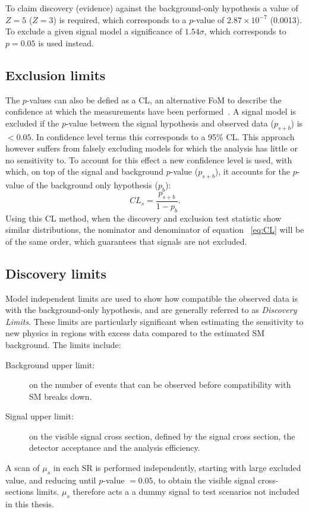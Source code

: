 	 To claim discovery (evidence) against the background-only hypothesis a value of $Z=5$ ($Z=3$) is required, which corresponds to a $p$-value of $2.87\times10^{-7}$ (0.0013). 
	To exclude a given signal model a significance of $1.54\sigma$, which corresponds to $p=0.05$ is used instead. 
	
	\subsection{Exclusion limits}
	The $p$-values can also be defied as a \ac{CL}, an alternative \ac{FoM} to describe the confidence at which the measurements have been performed~\cite{Read:2002hq}.
	A signal model is excluded if the $p$-value between the signal hypothesis and observed data ($p_{s+b}$) is $<0.05$. In confidence level terms this corresponds to a 95\% \ac{CL}. 
	This approach however suffers from falsely excluding models for which the analysis has little or no sensitivity to. 
	To account for this effect a new confidence level is used, with which, on top of the signal and background $p$-value ($p_{s+b}$), it accounts for the $p$-value of the background only hypothesis ($p_b$):
	\begin{equation}
	CL_s=\frac{p_{s+b}}{1-p_b}.
	\label{eq:CL}
	\end{equation}
	Using this \ac{CL} method, when the discovery and exclusion test statistic show similar distributions, the nominator and denominator of equation ~\ref{eq:CL}  will be of the same order, which guarantees that signals are not excluded. 
	\subsection{Discovery limits}
	Model independent limits are used to show how compatible the observed data is with the background-only hypothesis,
	and are generally referred to as \textit{Discovery Limits}. These limits are particularly significant when estimating the sensitivity to new physics in regions with excess data compared to the estimated \ac{SM} background. The limits include:
	\begin{description}
	\item[Background upper limit:] on the number of events that can be observed before compatibility with \ac{SM} breaks down.
	\item[Signal upper limit:] on the visible signal cross section, defined by the signal cross section, the detector acceptance and the analysis efficiency. 
	\end{description}
	A scan of $\mu_s$ in each \ac{SR} is performed independently, starting with large excluded value, and reducing until $p$-value $=0.05$, to obtain the visible signal cross-sections limits. $\mu_s$ therefore acts a a dummy signal to test scenarios not included in this thesis.

